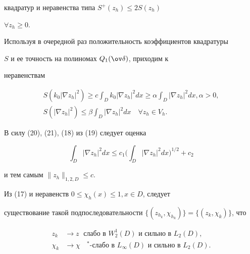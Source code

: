 \begin{pf}
квадратур и неравенства типа $ S^{+}(z_h) \leq 2 S(z_h)$


$\forall z_h \geq 0$.


Используя в очередной раз положительность коэффициентов квадратуры


$S$ и ее точность на полиномах $Q_1(\ov \delta)$, приходим к


неравенствам


\begin{gather}\label{20}


S(k_0 |\nabla z_h|^2) \geq c \int_D k_0 |\nabla z_h|^2 dx \geq \alpha


\int_D |\nabla z_h|^2 dx, \alpha > 0,\\


%


\label{21}


S (|\nabla z_h|^2) \leq \beta \int_D |\nabla z_h|^2 dx\quad \forall


z_h \in V_h.


\end{gather}


В силу (20), (21), (18) из (19) следует оценка


$$


\int_D |\nabla z_h|^2 dx \leq c_1 \bigg(\int_D |\nabla z_h|^2


dx\bigg)^{1/2}+ c_2


$$


и тем самым $\| z_h \|_{1,2,D} \leq c$.


\end{pf}





Из (17) и неравенств $0 \leq \chi_h(x) \leq 1, x \in D$, следует


существование такой подпоследовательности $\{(z_{h_k}, \chi_{h_k})\} =


\{(z_k, \chi_k)\}$, что


\begin{equation}\label{22}


\begin{split}


z_k &\longrightarrow z\; \text{ слабо в }


W_2^1(D) \text { и сильно в } L_2(D), \\


%


\chi_k &\longrightarrow \chi\; \text{ $^*$-слабо в } L_{\infty}(D) \text


{ и сильно в } L_2(D).


\end{split}


\end{equation}





